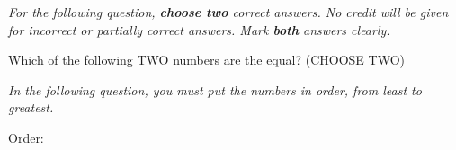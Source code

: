 \documentclass[11pt]{examdesign}
\begin{document}
\begin{multiplechoice} [title={Multiple Correct Multiple Choice},
	rearrange=no]
	\textit{For the following question, \textbf{choose two} correct answers.  No credit will be given for incorrect or partially correct answers.  Mark \textbf{both} answers clearly.} 
	
	
	\begin{question}
		Which of the following TWO numbers are the equal?  (CHOOSE TWO)
	\end{question}

\end{multiplechoice}

\begin{multiplechoice} [title={Ranking},
	rearrange=no]
	\textit{In the following question, you must put the numbers in order, from least to greatest.} 
	
	
	\begin{question}
		Order:
		\choice {$8.678 \times 10^{6}$}
		\choice {$5.678 \times 10^{-6}$}
		\choice{$3.435 \times 10^{18}$}
	\end{question}
	
	\vspace{1in}	
\end{multiplechoice}
\end{document}
